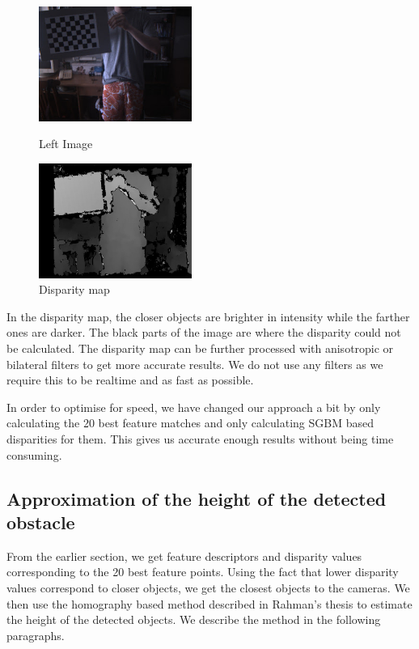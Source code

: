 \documentclass[11pt]{report}
\begin{document}
{{\begin{figure}
\centering
\parbox{5cm}{
\includegraphics[width=5cm]{left.jpg}
\caption{Left Image}
\label{fig:2figsA}}
\qquad
\begin{minipage}{5cm}
\includegraphics[width=5cm]{disp.jpg}
\caption{Disparity map}
\label{fig:2figsB}
\end{minipage}
\end{figure}




In the disparity map, the closer objects are brighter in intensity while the farther ones are darker. The black parts of the image are where the disparity could not be calculated. The disparity map can be further processed with anisotropic or bilateral filters to get more accurate results. We do not use any filters as we require this to be realtime and as fast as possible. 

In order to optimise for speed, we have changed our approach a bit by only calculating the 20 best feature matches and only calculating SGBM based disparities for them. This gives us accurate enough results without being time consuming. 

\label{height}
\subsection{Approximation of the height of the detected obstacle}

From the earlier section, we get feature descriptors and disparity values corresponding to the 20 best feature points. Using the fact that lower disparity values correspond to closer objects, we get the closest objects to the cameras. We then use the homography based method described in Rahman's thesis\cite{obstacleavoidance} to estimate the height of the detected objects. We describe the method in the following paragraphs.

}}
\end{document}
